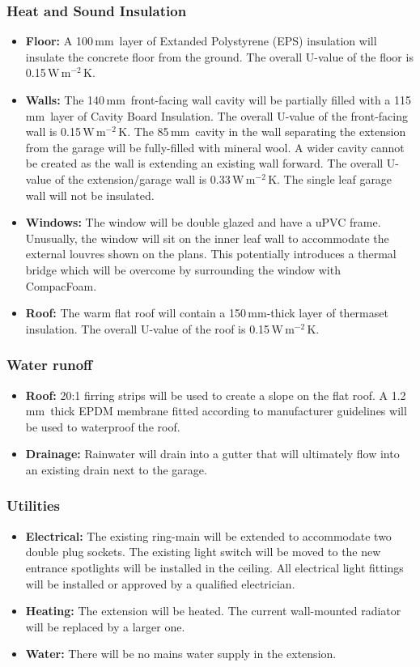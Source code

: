\documentclass{extension}
\newcommand{\mm}{\,$\mathrm{mm}$}
\newcommand{\uunit}{\,$\mathrm{W\,m^{-2}\,K}$}
\begin{document}
\subsubsection{Heat and Sound Insulation}
\begin{itemize}
  \item {\bf Floor:} A 100\mm\ layer of Extanded Polystyrene (EPS)\cite{efins} insulation will insulate the concrete floor from the ground. The overall U-value of the floor is 0.15\uunit .
  \item {\bf Walls:} The 140\mm\ front-facing wall cavity will be partially filled with a 115\mm\ layer of Cavity Board Insulation.\cite{ew1ins} The overall U-value of the front-facing wall is 0.15\uunit . The 85\mm\ cavity in the wall separating the extension from the garage will be fully-filled with mineral wool.\cite{ew2ins} A wider cavity cannot be created as the wall is extending an existing wall forward. The overall U-value of the extension/garage wall is 0.33\uunit. The single leaf garage wall will not be insulated.
  \item {\bf Windows:} The window will be double glazed and have a uPVC frame. Unusually, the window will sit on the inner leaf wall to accommodate the external louvres shown on the plans. This potentially introduces a thermal bridge which will be overcome by surrounding the window with CompacFoam.\cite{cfoam}
  \item {\bf Roof:} The warm flat roof will contain a 150\mm -thick layer of thermaset insulation.\cite{erins} The overall U-value of the roof is 0.15\uunit .
\end{itemize}
\subsubsection{Water runoff}
\begin{itemize}
  \item {\bf Roof:} 20:1 firring strips will be used to create a slope on the flat roof. A 1.2\mm\ thick EPDM membrane\cite{prmem} fitted according to manufacturer guidelines will be used to waterproof the roof.
  \item {\bf Drainage:} Rainwater will drain into a gutter that will ultimately flow into an existing drain next to the garage.
\end{itemize}
\subsubsection{Utilities}
\begin{itemize}
  \item {\bf Electrical:} The existing ring-main will be extended to accommodate two double plug sockets. The existing light switch will be moved to the new entrance spotlights will be installed in the ceiling. All electrical light fittings will be installed or approved by a qualified electrician.
  \item {\bf Heating:} The extension will be heated. The current wall-mounted radiator will be replaced by a larger one.
  \item {\bf Water:} There will be no mains water supply in the extension.
\end{itemize}
\end{document}
